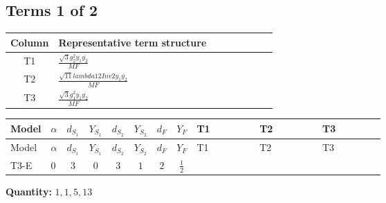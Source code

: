 \documentclass[8pt]{article}
\begin{document}
\begin{landscape}
\subsection*{Terms 1 of 2}
\begin{center}
\begin{tabular}{@{}c >{\raggedright\arraybackslash}p{0.82\linewidth}@{}}
\toprule
Column & Representative term structure \\
\midrule
T1 & \(\displaystyle \frac{\sqrt{3} g_{2}^{2} \overline{y_{1}} \overline{y_{2}}}{MF}\) \\
\midrule
T2 & \(\displaystyle \frac{\sqrt{11} lambda12Inv2 \overline{y_{1}} \overline{y_{2}}}{MF}\) \\
\midrule
T3 & \(\displaystyle \frac{\sqrt{3} g_{1}^{2} \overline{y_{1}} \overline{y_{2}}}{MF}\) \\
\midrule
\bottomrule
\end{tabular}
\end{center}
\smallskip
\tiny
\begin{longtable}{@{}llcccccc >{\raggedright\arraybackslash}p{0.21\linewidth} >{\raggedright\arraybackslash}p{0.21\linewidth} >{\raggedright\arraybackslash}p{0.21\linewidth}@{}}
\toprule
Model & $\alpha$ & $d_{S_1}$ & $Y_{S_1}$ & $d_{S_2}$ & $Y_{S_2}$ & $d_F$ & $Y_F$ & T1 & T2 & T3 \\
\midrule
\endfirsthead
\toprule
Model & $\alpha$ & $d_{S_1}$ & $Y_{S_1}$ & $d_{S_2}$ & $Y_{S_2}$ & $d_F$ & $Y_F$ & T1 & T2 & T3 \\
\midrule
\endhead
T3-E & $0$ & $3$ & $0$ & $3$ & $1$ & $2$ & $\frac{1}{2}$ & \scriptsize\adjustbox{max width=\linewidth}{$\begin{gathered} - \frac{11 \sqrt{3} g_{2}^{2} \overline{y_{1}} \overline{y_{2}}}{8 MF}\end{gathered}$} & \scriptsize\adjustbox{max width=\linewidth}{$\begin{gathered} - \frac{3 \sqrt{11} lambda12Inv2 \overline{y_{1}} \overline{y_{2}}}{22 MF}\end{gathered}$} & \scriptsize\adjustbox{max width=\linewidth}{$\begin{gathered} - \frac{\sqrt{3} g_{1}^{2} \overline{y_{1}} \overline{y_{2}}}{8 MF}\end{gathered}$} \\
\midrule
\bottomrule
\end{longtable}
\clearpage
\noindent\textbf{Quantity: }$\mathrm{1,1,5,13}$\par\smallskip

\end{landscape}
\end{document}
